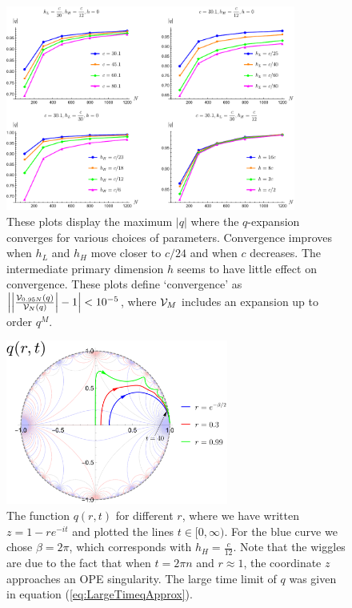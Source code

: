 \begin{figure}
\centering
\includegraphics[width=0.85\textwidth]{virasoro_chapter/qConvergentRange}	
\caption[Radius of convergence of $q$-expansion for various parameters]{These plots display the maximum  $|q|$ where the $q$-expansion converges for various choices of parameters.  Convergence improves when $h_L$ and $h_H$ move closer to $c/24$ and when $c$ decreases.  The intermediate primary dimension $h$ seems to have little effect on convergence.   These plots define `convergence' as $\left|\left|\frac{{\cal V}_{0.95N}(q)}{{\cal V}_N(q)}\right|-1\right|<10^{-5}$, where ${\cal V}_M$ includes an expansion up to order $q^M$.} 
\label{qConvergentRange}
\end{figure}


\begin{figure}
\centering
\includegraphics[width=0.65\textwidth]{virasoro_chapter/q_trajectory_with_BC}	
\caption[$q(r,t)$ curves in the $q$ circle for various $r$]{The function $q(r,t)$ for different $r$, where we have written $z = 1 - r e^{-it}$ and plotted the lines $t \in [0, \infty)$. For the blue curve we chose $\beta = 2 \pi$, which corresponds with $h_H = \frac{c}{12}$.  Note that the wiggles are due to the fact that when $t = 2 \pi n$ and $r \approx 1$, the coordinate $z$ approaches an OPE singularity. The large time limit of $q$ was given in equation (\ref{eq:LargeTimeqApprox}).}
\label{fig:qoft}
\end{figure}


